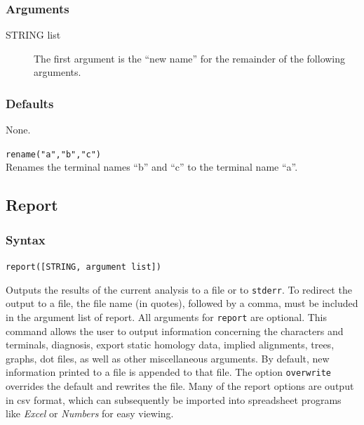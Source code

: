 	\subsubsection{Arguments}
	
	\begin{description}
	
		\item [STRING list]  The first argument is the ``new name'' for the remainder of the 
		following arguments.
		
	\end{description}
		
	\subsubsection{Defaults}
		None.
		
	\begin{example}
	
		\item{\texttt{rename("a","b","c")}\\ Renames the terminal names ``b'' and ``c'' to 
		the terminal name ``a''.}
		
	\end{example}


\subsection{Report}
\label{subsec:report}
	\subsubsection{Syntax}
		\texttt{report([STRING, argument list])}
	
	\begin{phygdescription}
		{Outputs the results of the current analysis to a file or to \texttt{stderr}. To redirect the 
		output to a file, the file name (in quotes), followed by a comma, must be included in 
		the argument list of report. All arguments for \texttt{report} are optional. This command 
		allows the user to output information concerning the characters and terminals, 
		diagnosis, export static homology data, implied alignments, trees, graphs, dot files, 
		as well as other miscellaneous arguments. By default, new information printed to 
		a file is appended to that file. The option \texttt{overwrite} overrides the default and 
		rewrites the file. Many of the report options are output in csv format, which can
		subsequently be imported into spreadsheet programs like \textit{Excel} or 
		\textit{Numbers} for easy viewing.}
	\end{phygdescription}
	
